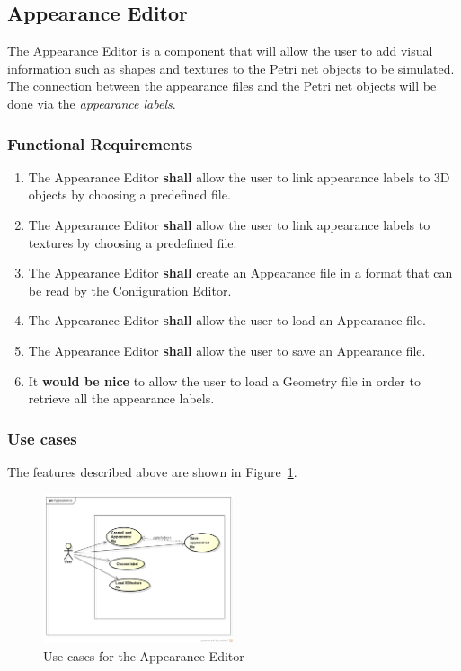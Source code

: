 \subsection{Appearance Editor}
\label{sec:sf-appearance}

The Appearance Editor is a component that will allow the user to add visual information such as shapes and textures to the Petri net objects to be simulated. The connection between the appearance files and the Petri net objects will be done via the \textit{appearance labels}. 

\subsubsection{Functional Requirements}

\begin{enumerate}
\item The Appearance Editor \textbf{shall} allow the user to link appearance labels to 3D objects by choosing a predefined file.
\item The Appearance Editor \textbf{shall} allow the user to link appearance labels to textures by choosing a predefined file.
\item The Appearance Editor \textbf{shall} create an Appearance file in a format that can be read by the Configuration Editor.
\item The Appearance Editor \textbf{shall} allow the user to load an Appearance file.
\item The Appearance Editor \textbf{shall} allow the user to save an Appearance file.
\item It \textbf{would be nice} to allow the user to load a Geometry file in order to retrieve all the appearance labels.     
\end{enumerate}

\subsubsection{Use cases}

The features described above are shown in Figure~\ref{fig:use-cases-appearance-editor}.

\begin{figure}[htp]
\begin{center}
  \includegraphics[width=0.5\textwidth]{image/uc-appearance.png}
  \caption{Use cases for the Appearance Editor}
  \label{fig:use-cases-appearance-editor}
\end{center}
\end{figure}

